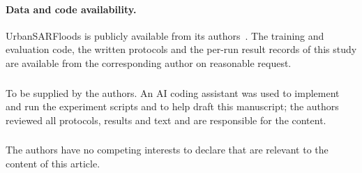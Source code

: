 \documentclass[runningheads]{llncs}
\begin{document}
\paragraph{Data and code availability.} UrbanSARFloods is publicly available from its
authors~\cite{zhao2024urbansarfloods}. The training and evaluation code, the written
protocols and the per-run result records of this study are available from the corresponding
author on reasonable request.

\begin{credits}
\subsubsection{\ackname} To be supplied by the authors. An AI coding assistant was used to
implement and run the experiment scripts and to help draft this manuscript; the authors
reviewed all protocols, results and text and are responsible for the content.

\subsubsection{\discintname} The authors have no competing interests to declare that are
relevant to the content of this article.
\end{credits}





\end{document}
